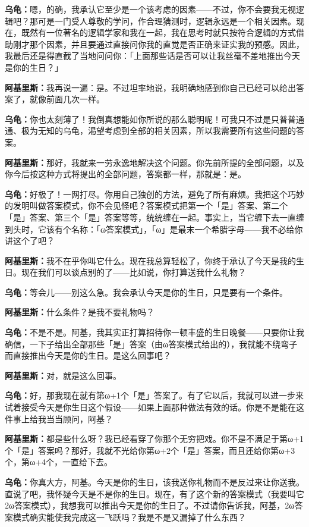 \documentclass[
  12pt,
  twoside,
  openright,
  oldfontcommands,
]{memoir}
\newcommand{\dialogname}[1]{{\heifamily\bfseries #1}}
\begin{document}
\dialogname{乌龟：}嗯，的确，我承认它至少是一个该考虑的因素------不过，你不会要我无视逻辑吧？那可是一门受人尊敬的学问，作合理猜测时，逻辑永远是一个相关因素。现在，既然有一位著名的逻辑学家和我在一起，我在思考时就只按符合逻辑的方式借助刚才那个因素，并且要通过直接问你我的直觉是否正确来证实我的预感。因此，我最后还是得直截了当地问问你：「上面那些话是否可以让我丝毫不差地推出今天是你的生日？」

\dialogname{阿基里斯：}我再说一遍：是。不过坦率地说，我明确地感到你自己已经可以给出答案了，就像前面几次一样。

\dialogname{乌龟：}你也太刻薄了！我倒真想能如你所说的那么聪明呢！可我只不过是只普普通通、极为无知的乌龟，渴望考虑到全部的相关因素，所以我需要所有这些问题的答案。

\dialogname{阿基里斯：}那好，我就来一劳永逸地解决这个问题。你先前所提的全部问题，以及你今后按这种方式将提出的全部问题，答案都一样，那就是：是。

\dialogname{乌龟：}好极了！一网打尽。你用自己独创的方法，避免了所有麻烦。我把这个巧妙的发明叫做答案模式，你不会见怪吧？答案模式把第一个「是」答案、第二个「是」答案、第三个「是」答案等等，统统缠在一起。事实上，当它缠下去一直缠到头时，它该有个名称：「ω答案模式」，「ω」是最末一个希腊字母------我不必给你讲这个了吧？

\dialogname{阿基里斯：}我不在乎你叫它什么。现在我总算轻松了，你终于承认了今天是我的生日。现在我们可以谈点别的了------比如说，你打算送我什么礼物？

\dialogname{乌龟：}等会儿------别这么急。我会承认今天是你的生日，只是要有一个条件。

\dialogname{阿基里斯：}什么条件？是我不要礼物吗？

\dialogname{乌龟：}不是不是。阿基，我其实正打算招待你一顿丰盛的生日晚餐------只要你让我确信，一下子给出全部那些「是」答案（由ω答案模式给出的），我就能不绕弯子而直接推出今天是你的生日。是这么回事吧？

\dialogname{阿基里斯：}对，就是这么回事。

\dialogname{乌龟：}好，那我现在就有第ω+1个「是」答案了。有了它以后，我就可以进一步来试着接受今天是你生日这个假设------如果上面那种做法有效的话。你是不是能在这件事上给我当当顾问，阿基？

\dialogname{阿基里斯：}都是些什么呀？我已经看穿了你那个无穷把戏。你不是不满足于第ω+1个「是」答案吗？那好，我就不光给你第ω+2个「是」答案，而且还给你第ω+3个，第ω+4个，一直给下去。

\dialogname{乌龟：}你真大方，阿基。今天是你的生日，该我送你礼物而不是反过来让你送我。直说了吧，我怀疑今天是不是你的生日。现在，有了这个新的答案模式（我要叫它2ω答案模式），我想我可以推出今天是你的生日了。不过请你告诉我，阿基，2ω答案模式确实能使我完成这一飞跃吗？我是不是又漏掉了什么东西？
\end{document}
